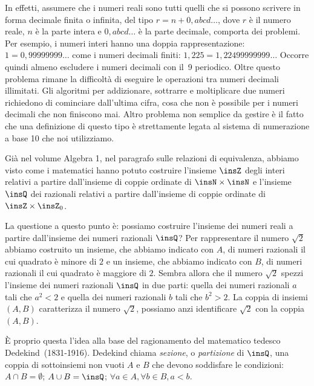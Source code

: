 In effetti, assumere che i numeri reali sono tutti quelli che si possono scrivere in forma decimale finita o infinita, del tipo $r=n+0,abcd\ldots$, dove $r$ è il numero reale, $n$ è la parte intera e $0,abcd\ldots$ è la parte decimale, comporta dei problemi. Per esempio, i numeri interi hanno una doppia rappresentazione: $1=0,99999999\ldots$ come i numeri decimali finiti: $1,225=1,22499999999\ldots$ Occorre quindi almeno escludere i numeri decimali con il~9 periodico. Oltre questo problema rimane la difficoltà di eseguire le operazioni tra numeri decimali illimitati. Gli algoritmi per addizionare, sottrarre e moltiplicare due numeri richiedono di cominciare dall'ultima cifra, cosa che non è possibile per i numeri decimali che non finiscono mai. Altro problema non semplice da gestire è il fatto che una definizione di
questo tipo è strettamente legata al sistema di numerazione a base 10 che noi utilizziamo.

Già nel volume Algebra 1, nel paragrafo sulle relazioni di equivalenza, abbiamo visto come i matematici hanno potuto costruire l'insieme $\insZ$ degli interi relativi a partire dall'insieme di coppie ordinate di $\insN \times \insN$ e l'insieme $\insQ$ dei razionali relativi a partire dall'insieme di coppie ordinate di $\insZ \times \insZ_{0}$.

La questione a questo punto è: possiamo costruire l'insieme dei numeri reali a partire dall'insieme dei numeri razionali $\insQ$? Per rappresentare il numero $\sqrt{2}$ abbiamo costruito un insieme, che abbiamo indicato con $A$, di numeri razionali il cui quadrato è minore di $2$ e un insieme, che abbiamo indicato con $B$, di numeri razionali il cui quadrato è maggiore di $2$. Sembra allora che il numero $\sqrt{2}$ spezzi l'insieme dei numeri razionali $\insQ$ in due parti: quella dei numeri razionali $a$ tali che $a^{2}<2$ e quella dei numeri razionali $b$ tali che $b^{2}>2$. La coppia di insiemi $(A,B)$ caratterizza il numero $\sqrt{2}$, possiamo anzi identificare $\sqrt{2}$ con la coppia $(A,B)$.

È proprio questa l'idea alla base del ragionamento del matematico tedesco Dedekind~(1831-1916). Dedekind chiama \emph{sezione}, o \emph{partizione} di $\insQ$, una coppia di sottoinsiemi non vuoti $A$ e $B$ che devono soddisfare le condizioni: $A \cap B=\emptyset$; $A \cup B=\insQ$; $\forall a \in A, \forall b \in B, a<b$.

